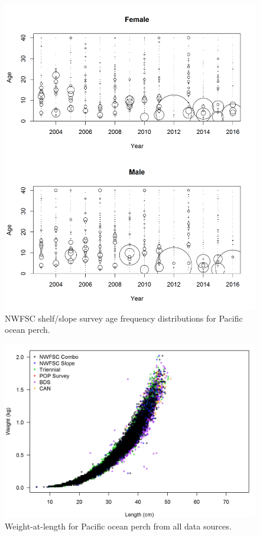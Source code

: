\documentclass[12pt,]{article}
\begin{document}
\begin{figure}
\centering
\includegraphics{Figures/NWFSCcombo_Ages.png}
\caption{NWFSC shelf/slope survey age frequency distributions for
Pacific ocean perch. \label{fig:nw_Age}}
\end{figure}

\begin{figure}
\centering
\includegraphics{Figures/weightAtLengthBySource.png}
\caption{Weight-at-length for Pacific ocean perch from all data sources.
\label{fig:Wt_len}}
\end{figure}
\end{document}
